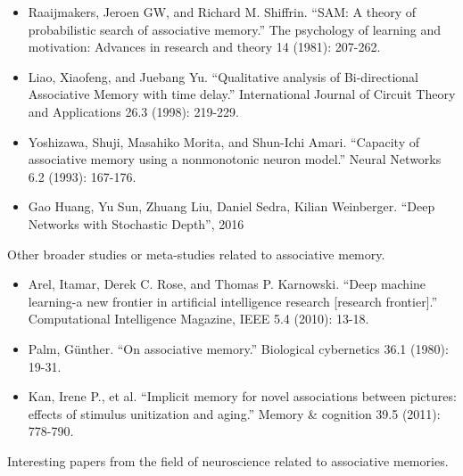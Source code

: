 \documentclass[12pt, a4paper]{article}
\begin{document}
\begin{itemize}
	\item Raaijmakers, Jeroen GW, and Richard M. Shiffrin. ``SAM: A theory of probabilistic search of associative memory.'' The psychology of learning and motivation: Advances in research and theory 14 (1981): 207-262.
	\item Liao, Xiaofeng, and Juebang Yu. ``Qualitative analysis of Bi-directional Associative Memory with time delay.'' International Journal of Circuit Theory and Applications 26.3 (1998): 219-229.
	\item Yoshizawa, Shuji, Masahiko Morita, and Shun-Ichi Amari. ``Capacity of associative memory using a nonmonotonic neuron model.'' Neural Networks 6.2 (1993): 167-176.
	\item Gao Huang, Yu Sun, Zhuang Liu, Daniel Sedra, Kilian Weinberger. ``Deep Networks with Stochastic Depth'', 2016
\end{itemize}

Other broader studies or meta-studies related to associative memory.

\begin{itemize}
\item Arel, Itamar, Derek C. Rose, and Thomas P. Karnowski. ``Deep machine learning-a new frontier in artificial intelligence research [research frontier].'' Computational Intelligence Magazine, IEEE 5.4 (2010): 13-18.
\item Palm, Günther. ``On associative memory.'' Biological cybernetics 36.1 (1980): 19-31.
\item Kan, Irene P., et al. ``Implicit memory for novel associations between pictures: effects of stimulus unitization and aging.'' Memory \& cognition 39.5 (2011): 778-790.
\end{itemize}

Interesting papers from the field of neuroscience related to associative memories.
\end{document}
